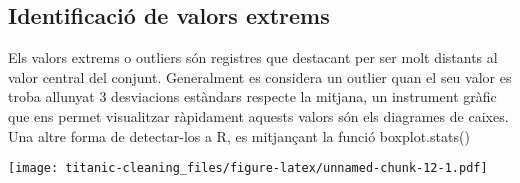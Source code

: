 \documentclass[]{article}
\newenvironment{Shaded}{\begin{snugshade}}{\end{snugshade}}
\newcommand{\DataTypeTok}[1]{\textcolor[rgb]{0.13,0.29,0.53}{#1}}
\newcommand{\KeywordTok}[1]{\textcolor[rgb]{0.13,0.29,0.53}{\textbf{#1}}}
\newcommand{\NormalTok}[1]{#1}
\newcommand{\OperatorTok}[1]{\textcolor[rgb]{0.81,0.36,0.00}{\textbf{#1}}}
\newcommand{\StringTok}[1]{\textcolor[rgb]{0.31,0.60,0.02}{#1}}
\begin{document}
\hypertarget{identificaciuxf3-de-valors-extrems}{%
\subsection{Identificació de valors
extrems}\label{identificaciuxf3-de-valors-extrems}}

Els valors extrems o outliers són registres que destacant per ser molt
distants al valor central del conjunt. Generalment es considera un
outlier quan el seu valor es troba allunyat 3 desviacions estàndars
respecte la mitjana, un instrument gràfic que ens permet visualitzar
ràpidament aquests valors són els diagrames de caixes. Una altre forma
de detectar-los a R, es mitjançant la funció boxplot.stats()

\begin{Shaded}
\end{Shaded}

\texttt{[image: titanic-cleaning\_files/figure-latex/unnamed-chunk-12-1.pdf]}

\begin{Shaded}
\end{Shaded}
\end{document}
